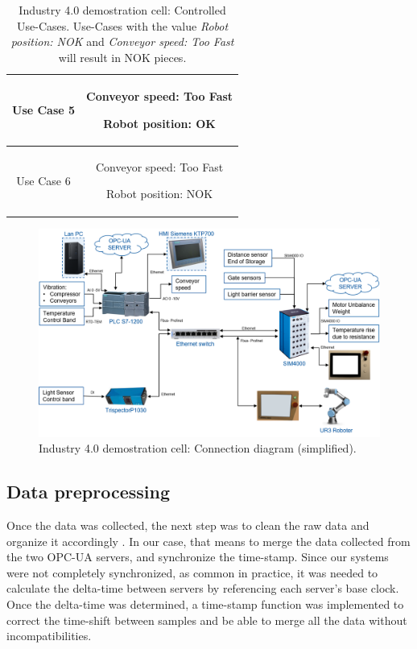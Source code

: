 \documentclass[5p,times,procedia]{elsarticle}
\begin{document}
\begin{table}
\begin{tabular}{ c c }
              Use Case 5  & \begin{minipage}[t]{0.25\textwidth}
                            \begin{description}
                                   \item Conveyor speed: Too Fast
                                   \item Robot position: OK
                            \end{description}
                            \end{minipage}  \\ \hline
              Use Case 6  & \begin{minipage}[t]{0.25\textwidth}
                            \begin{description}
                                   \item Conveyor speed: Too Fast
                                   \item Robot position: NOK
                            \end{description}
                            \end{minipage}  \\ \bottomrule
       \end{tabular}
       \caption{Industry 4.0 demostration cell: Controlled Use-Cases.
       Use-Cases with the value \textit{Robot position: NOK} and \textit{Conveyor speed: Too Fast} will result in NOK pieces.}
       \label{tab:use_cases}
\end{table}


\begin{figure}
       \includegraphics[width=.45\textwidth]{img/demozelle_conex_diagram.png}
       \caption{Industry 4.0 demostration cell: Connection diagram (simplified).
             }
\label{fig:demo_conn_diag}
\end{figure}

\subsection{Data preprocessing}

Once the data was collected, the next step was to clean the raw data and organize it accordingly \cite{goodfellow2016deep}. In our case, that means to merge the data collected from the two OPC-UA servers, and synchronize the time-stamp. Since our systems were not completely synchronized, as common in practice, it was needed to calculate the delta-time between servers by referencing each server's base clock. Once the delta-time was determined, a time-stamp function was implemented to correct the time-shift between samples and be able to merge all the data without incompatibilities.
\end{document}
